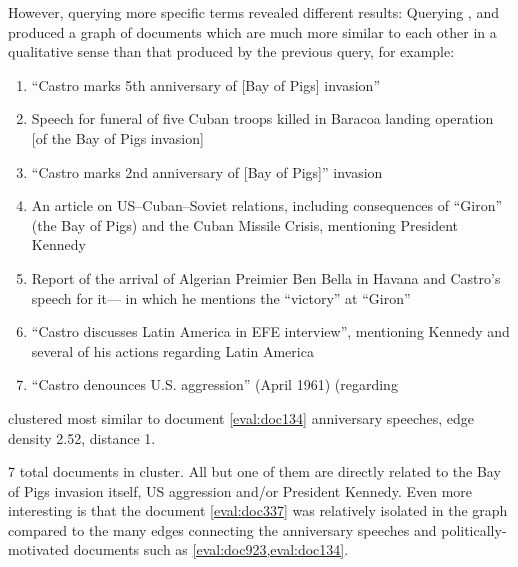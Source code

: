 However, querying more specific terms revealed different results: Querying , and  produced a graph of documents which are much more similar to each other in a qualitative sense than that produced by the previous query, for example:

\begin{enumerate}
\item ``Castro marks 5th anniversary of [Bay of Pigs] invasion'' \label{eval:doc274}
\item Speech for funeral of five Cuban troops killed in Baracoa landing operation [of the Bay of Pigs invasion]\label{eval:doc337}
\item ``Castro marks 2nd anniversary of [Bay of Pigs]'' invasion \label{eval:doc210}
\item An article on US--Cuban--Soviet relations, including consequences of ``Giron'' (the Bay of Pigs) and the Cuban Missile Crisis, mentioning President Kennedy\label{eval:doc864}
\item Report of the arrival of Algerian Preimier Ben Bella in Havana and Castro's speech for it--- in which he mentions the ``victory'' at ``Giron''
\item ``Castro discusses Latin America in EFE interview'', mentioning Kennedy and several of his actions regarding Latin America \label{eval:doc923}
\item ``Castro denounces U.S. aggression'' (April 1961) \label{eval:doc134} (regarding 
\end{enumerate} 

clustered most similar to document \ref{eval:doc134} anniversary speeches, edge density 2.52, distance 1.

7 total documents in cluster. All but one of them are directly related to the Bay of Pigs invasion itself, US aggression and/or President Kennedy. Even more interesting is that the document \ref{eval:doc337} was relatively isolated in the graph compared to the many edges connecting the anniversary speeches and politically-motivated documents such as \ref{eval:doc923,eval:doc134}.